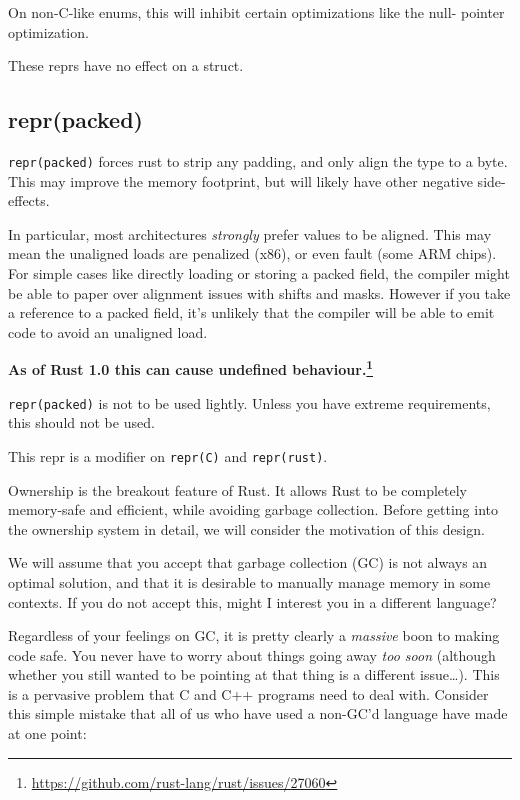 \documentclass[a4paper,]{book}
\renewcommand{\href}[2]{#2\footnote{\url{#1}}}
\begin{document}
On non-C-like enums, this will inhibit certain optimizations like the
null- pointer optimization.

These reprs have no effect on a struct.

\subsection{repr(packed)}\label{reprpacked}

\texttt{repr(packed)} forces rust to strip any padding, and only align
the type to a byte. This may improve the memory footprint, but will
likely have other negative side-effects.

In particular, most architectures \emph{strongly} prefer values to be
aligned. This may mean the unaligned loads are penalized (x86), or even
fault (some ARM chips). For simple cases like directly loading or
storing a packed field, the compiler might be able to paper over
alignment issues with shifts and masks. However if you take a reference
to a packed field, it's unlikely that the compiler will be able to emit
code to avoid an unaligned load.

\textbf{\href{https://github.com/rust-lang/rust/issues/27060}{As of Rust
1.0 this can cause undefined behaviour.}}

\texttt{repr(packed)} is not to be used lightly. Unless you have extreme
requirements, this should not be used.

This repr is a modifier on \texttt{repr(C)} and \texttt{repr(rust)}.


Ownership is the breakout feature of Rust. It allows Rust to be
completely memory-safe and efficient, while avoiding garbage collection.
Before getting into the ownership system in detail, we will consider the
motivation of this design.

We will assume that you accept that garbage collection (GC) is not
always an optimal solution, and that it is desirable to manually manage
memory in some contexts. If you do not accept this, might I interest you
in a different language?

Regardless of your feelings on GC, it is pretty clearly a \emph{massive}
boon to making code safe. You never have to worry about things going
away \emph{too soon} (although whether you still wanted to be pointing
at that thing is a different issue\ldots{}). This is a pervasive problem
that C and C++ programs need to deal with. Consider this simple mistake
that all of us who have used a non-GC'd language have made at one point:
\end{document}
